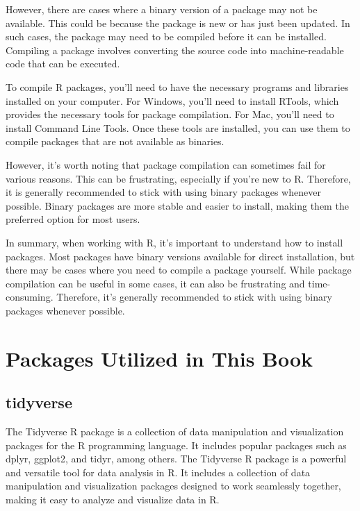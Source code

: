 \documentclass[
]{book}
\begin{document}
However, there are cases where a binary version of a package may not be available. This could be because the package is new or has just been updated. In such cases, the package may need to be compiled before it can be installed. Compiling a package involves converting the source code into machine-readable code that can be executed.

To compile R packages, you'll need to have the necessary programs and libraries installed on your computer. For Windows, you'll need to install RTools, which provides the necessary tools for package compilation. For Mac, you'll need to install Command Line Tools. Once these tools are installed, you can use them to compile packages that are not available as binaries.

However, it's worth noting that package compilation can sometimes fail for various reasons. This can be frustrating, especially if you're new to R. Therefore, it is generally recommended to stick with using binary packages whenever possible. Binary packages are more stable and easier to install, making them the preferred option for most users.

In summary, when working with R, it's important to understand how to install packages. Most packages have binary versions available for direct installation, but there may be cases where you need to compile a package yourself. While package compilation can be useful in some cases, it can also be frustrating and time-consuming. Therefore, it's generally recommended to stick with using binary packages whenever possible.

\hypertarget{packages-utilized-in-this-book}{%
\section{Packages Utilized in This Book}\label{packages-utilized-in-this-book}}

\hypertarget{tidyverse}{%
\subsection{tidyverse}\label{tidyverse}}

The Tidyverse R package is a collection of data manipulation and visualization packages for the R programming language. It includes popular packages such as dplyr, ggplot2, and tidyr, among others. The Tidyverse R package is a powerful and versatile tool for data analysis in R. It includes a collection of data manipulation and visualization packages designed to work seamlessly together, making it easy to analyze and visualize data in R.
\end{document}
